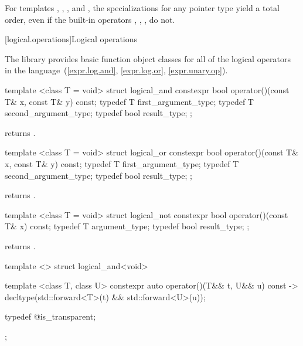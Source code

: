 \pnum
For templates , , , and
, the specializations for any pointer type yield a total order,
even if the built-in operators \tcode{<}, \tcode{>}, \tcode{<=}, \tcode{>=}
do not.

[logical.operations]{Logical operations}

\pnum
The library provides basic function object classes for all of the logical
operators in the language~(\ref{expr.log.and}, \ref{expr.log.or}, \ref{expr.unary.op}).

%
\begin{itemdecl}
template <class T = void> struct logical_and {
  constexpr bool operator()(const T& x, const T& y) const;
  typedef T first_argument_type;
  typedef T second_argument_type;
  typedef bool result_type;
};
\end{itemdecl}

\begin{itemdescr}
\pnum
{} returns .
\end{itemdescr}

%
\begin{itemdecl}
template <class T = void> struct logical_or {
  constexpr bool operator()(const T& x, const T& y) const;
  typedef T first_argument_type;
  typedef T second_argument_type;
  typedef bool result_type;
};
\end{itemdecl}

\begin{itemdescr}
\pnum
{} returns .
\end{itemdescr}

%
\begin{itemdecl}
template <class T = void> struct logical_not {
  constexpr bool operator()(const T& x) const;
  typedef T argument_type;
  typedef bool result_type;
};
\end{itemdecl}

\begin{itemdescr}
\pnum
{} returns .
\end{itemdescr}

%
\begin{itemdecl}
template <> struct logical_and<void> {
  template <class T, class U> constexpr auto operator()(T&& t, U&& u) const
    -> decltype(std::forward<T>(t) && std::forward<U>(u));

  typedef @\unspec@ is_transparent;
};
\end{itemdecl}

